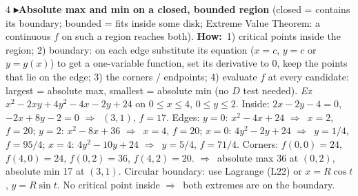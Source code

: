 \documentclass{article}
\newcommand\pt[1]{\textbf{{\symf ▸}#1}}       %
\newcommand\ex{\textit{Ex}\ }                  %
\newcommand\how{\textbf{How:}\ }
\newcommand\then{\ensuremath{\Rightarrow}}
\begin{document}
\begin{multicols*}{4}
\pt{Absolute max and min on a closed, bounded region} (closed = contains its boundary; bounded = fits inside some disk; Extreme Value Theorem: a continuous $f$ on such a region reaches both). \how 1) critical points inside the region; 2) boundary: on each edge substitute its equation ($x=c$, $y=c$ or $y=g(x)$) to get a one-variable function, set its derivative to 0, keep the points that lie on the edge; 3) the corners / endpoints; 4) evaluate $f$ at every candidate: largest = absolute max, smallest = absolute min (no $D$ test needed). \ex $x^2-2xy+4y^2-4x-2y+24$ on $0\le x\le4$, $0\le y\le2$. Inside: $2x-2y-4=0$, $-2x+8y-2=0$ \then\ $(3,1)$, $f=17$. Edges: $y=0$: $x^2-4x+24$ \then\ $x=2$, $f=20$; $y=2$: $x^2-8x+36$ \then\ $x=4$, $f=20$; $x=0$: $4y^2-2y+24$ \then\ $y=1/4$, $f=95/4$; $x=4$: $4y^2-10y+24$ \then\ $y=5/4$, $f=71/4$. Corners: $f(0,0)=24$, $f(4,0)=24$, $f(0,2)=36$, $f(4,2)=20$. \then\ absolute max 36 at $(0,2)$, absolute min 17 at $(3,1)$. Circular boundary: use Lagrange (L22) or $x=R\cos t$, $y=R\sin t$. No critical point inside \then\ both extremes are on the boundary.


\end{multicols*}
\end{document}
